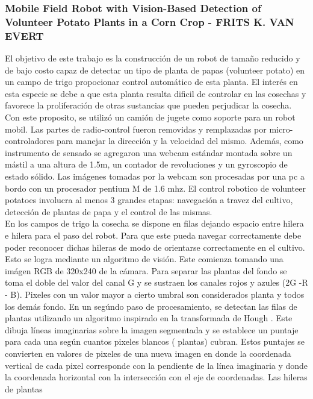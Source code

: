 	\subsubsection{Mobile Field Robot with Vision-Based Detection of Volunteer Potato Plants in a Corn Crop - FRITS K. VAN EVERT}
	El objetivo de este trabajo es la construcción de un robot de 
	tamaño reducido y de bajo costo capaz de detectar un tipo de 
	planta de papas (volunteer potato) en un campo de trigo propocionar control automático de esta planta. El interés en 
	esta especie se debe a que esta planta resulta dificil de controlar en las cosechas y favorece la 
	proliferación de otras sustancias que pueden perjudicar la
	cosecha. Con este proposito, se utilizó un camión de jugete como 
	soporte para un robot mobil. Las partes de radio-control fueron 
	removidas y remplazadas por micro-controladores para manejar la 
	dirección y la velocidad del mismo. Además, como instrumento de 
	sensado se agregaron una webcam estándar montada sobre un mástil a 
	una altura de 1.5m, un contador de revoluciones y un gyroscopio de 
	estado sólido. Las imágenes tomadas por la webcam son procesadas 
	por una pc a bordo con un procesador pentium M de 1.6 mhz. El control robotico de volunteer potatoes involucra al 
	menos 3 grandes etapas: navegación a travez del cultivo, detección 
	de plantas de papa y el control de las mismas.\\
	\indent En los campos de trigo la cosecha se dispone en filas 
	dejando espacio entre hilera e hilera para el paso del robot. Para 
	que este pueda navegar correctamente debe poder reconocer dichas 
	hileras de modo de orientarse correctamente en el cultivo. Esto se 
	logra mediante un algoritmo de visión. Este comienza 
	tomando una imágen RGB de 320x240 de la cámara. Para separar las 
	plantas del fondo se toma el doble del valor del canal G  y se 
	sustraen los canales rojos y azules (2G -R - B). Pixeles con un 
	valor mayor a cierto umbral son considerados planta y todos los 
	demás fondo. En un segúndo paso de procesamiento, se detectan las 
	filas de plantas utilizando un algoritmo inspirado en la 
	transformada de Hough \cite{hough62}. Este dibuja líneas imaginarias sobre la 
	imagen segmentada y se establece un puntaje para cada una según 
	cuantos pixeles blancos ( plantas) cubran. Estos puntajes se 
	convierten en valores de pixeles de una nueva imagen en donde la 
	coordenada vertical de cada pixel corresponde con la pendiente de 
	la línea imaginaria y donde la coordenada horizontal con la 
	intersección con el eje de coordenadas. Las hileras de plantas 
